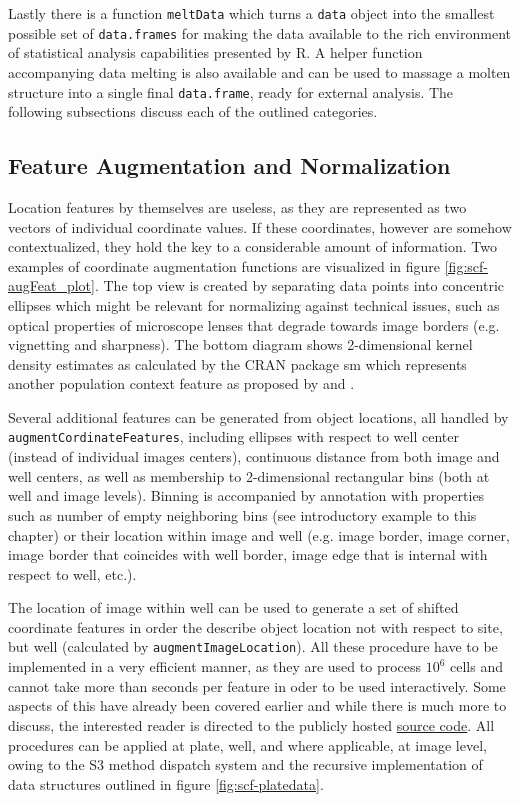 Lastly there is a function \texttt{meltData} which turns a \texttt{data} object into the smallest possible set of \texttt{data.frames} for making the data available to the rich environment of statistical analysis capabilities presented by R. A helper function accompanying data melting is also available and can be used to massage a molten structure into a single final \texttt{data.frame}, ready for external analysis. The following subsections discuss each of the outlined categories.



\subsection{Feature Augmentation and Normalization}
Location features by themselves are useless, as they are represented as two vectors of individual coordinate values. If these coordinates, however are somehow contextualized, they hold the key to a considerable amount of information. Two examples of coordinate augmentation functions are visualized in figure \ref{fig:scf-augFeat_plot}. The top view is created by separating data points into concentric ellipses which might be relevant for normalizing against technical issues, such as optical properties of microscope lenses that degrade towards image borders (e.g. vignetting and sharpness). The bottom diagram shows 2-dimensional kernel density estimates as calculated by the CRAN package sm \citep{Bowman2014} which represents another population context feature as proposed by \cite{Knapp2011} and \cite{Snijder2012}.

Several additional features can be generated from object locations, all handled by \texttt{augmentCordinateFeatures}, including ellipses with respect to well center (instead of individual images centers), continuous distance from both image and well centers, as well as membership to 2-dimensional rectangular bins (both at well and image levels). Binning is accompanied by annotation with properties such as number of empty neighboring bins (see introductory example to this chapter) or their location within image and well (e.g. image border, image corner, image border that coincides with well border, image edge that is internal with respect to well, etc.).

The location of image within well can be used to generate a set of shifted coordinate features in order the describe object location not with respect to site, but well (calculated by \texttt{augmentImageLocation}). All these procedure have to be implemented in a very efficient manner, as they are used to process \tilde $10^6$ cells and cannot take more than seconds per feature in oder to be used interactively. Some aspects of this have already been covered earlier and while there is much more to discuss, the interested reader is directed to the publicly hosted \href{https://github.com/nbenn/singleCellFeatures}{source code}. All procedures can be applied at plate, well, and where applicable, at image level, owing to the S3 method dispatch system and the recursive implementation of data structures outlined in figure \ref{fig:scf-platedata}.

